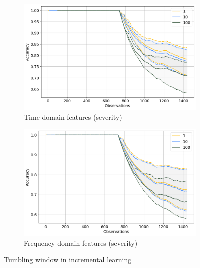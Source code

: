 \begin{figure}[h]
\begin{subfigure}[b]{0.48\textwidth}
        \includegraphics[width=\textwidth]{assets/results/incremental-learning/tumbling-TD-severity.png}
        \caption{Time-domain features (severity)}
    \end{subfigure}
    \hfill
    \begin{subfigure}[b]{0.48\textwidth}
        \includegraphics[width=\textwidth]{assets/results/incremental-learning/tumbling-FD-severity.png}
        \caption{Frequency-domain features (severity)}
    \end{subfigure} 
    \caption{Tumbling window in incremental learning}
\end{figure}


